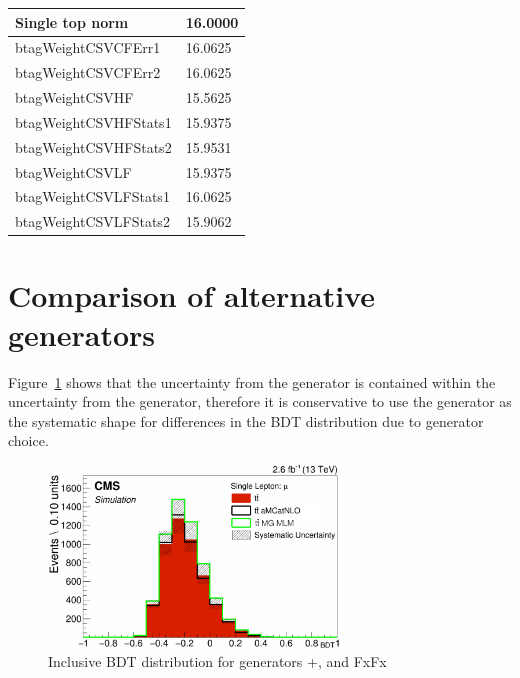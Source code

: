 \begin{table}[ht]
\begin{tabular}{|l|l|}
Single top norm                & 16.0000                                                         \\ \hline
btagWeightCSVCFErr1            & 16.0625                                                         \\ \hline
btagWeightCSVCFErr2            & 16.0625                                                         \\ \hline
btagWeightCSVHF                & 15.5625                                                         \\ \hline
btagWeightCSVHFStats1          & 15.9375                                                         \\ \hline
btagWeightCSVHFStats2          & 15.9531                                                         \\ \hline
btagWeightCSVLF                & 15.9375                                                         \\ \hline
btagWeightCSVLFStats1          & 16.0625                                                         \\ \hline
btagWeightCSVLFStats2          & 15.9062                                                         \\ \hline
\end{tabular}
\end{table}

\section{Comparison of alternative \ttbar generators}

Figure~\ref{fig:MGFXFX} shows that the uncertainty from the \MADGRAPH \aMCATNLO generator is contained within the uncertainty from the \MLM generator, therefore it is conservative to use the \MLM generator as the systematic shape for differences in the BDT distribution due to generator choice.

\begin{figure}[ht]
\centering
    \includegraphics[width=0.7\textwidth]{images/Run2/MG_FXFX.pdf}
    \caption{Inclusive BDT distribution for \ttbar generators \POWHEG+\PYTHIA, \MLM and \MADGRAPH \aMCATNLO FxFx}
    \label{fig:MGFXFX}
\end{figure} 



